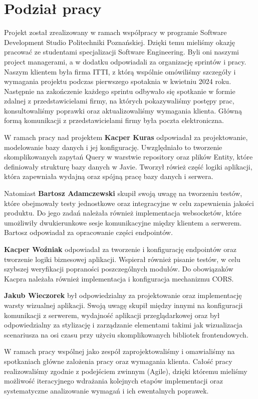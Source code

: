 \section{Podział pracy}
Projekt został zrealizowany w ramach współpracy w programie Software Development Studio Politechniki Poznańskiej. Dzięki temu mieliśmy okazję pracować ze studentami
specjalizacji Software Engineering. Byli oni naszymi project managerami, a w dodatku odpowiadali za organizację sprintów i pracy. Naszym klientem była firma ITTI, z którą
wspólnie omówiliśmy szczegóły i wymagania projektu podczas pierwszego spotaknia w kwietniu 2024 roku. Następnie na zakończenie każdego sprintu odbywało się spotkanie w formie zdalnej
z przedstawicielami firmy, na których pokazywaliśmy postępy prac, konsultowaliśmy poprawki oraz aktualizowaliśmy wymagania klienta. Główną formą komunikacji z przedstawicielami firmy
była poczta elektroniczna.

W ramach pracy nad projektem \textbf{Kacper Kuras} odpowiadał za projektowanie, modelowanie bazy danych i jej konfigurację. Uwzględniało
to tworzenie skomplikowanych zapytań Query w warstwie repository oraz plików Entity, które definiowały strukturę bazy danych w Javie. Tworzył rówież część logiki aplikacji, która zapewniała wydajną oraz spójną pracę bazy danych i serwera.

Natomiast \textbf{Bartosz Adamczewski} skupił swoją uwagę na tworzeniu testów, które obejmowały testy jednostkowe oraz integracyjne w celu zapewnienia jakości produktu.
Do jego zadań należała również implementacja websocketów, które umożliwiły dwukierunkowe sesje komunikacyjne między klientem a serwerem. Bartosz odpowiadał za opracowanie części endpointów.

\textbf{Kacper Woźniak} odpowiadał za tworzenie i konfigurację endpointów oraz tworzenie logiki biznesowej aplikacji. Wspierał również pisanie testów, w celu szybszej weryfikacji popraności poszczególnych modułów.
Do obowiązaków Kacpra należała również implementacja i konfiguracja mechanizmu CORS.

\textbf{Jakub Wieczorek} był odpowiedzialny za projektowanie oraz implementację warsty wizualnej aplikacji. Swoją uwagę skupił między innymi na konfiguracji komunikacji z serwerem, wydajność aplikacji przeglądarkowej oraz
był odpowiedzialny za stylizację i zarządzanie elementami takimi jak wizualizacja scenariusza na osi czasu przy użyciu skomplikowanych bibliotek frontendowych.

W ramach pracy wspólnej jako zespół zaprojektowaliśmy i omawialiśmy na spotkaniach główne zalożenia pracy oraz wymagania klienta. Całość pracy realizowaliśmy zgodnie z podejściem zwinnym (Agile), dzięki któremu mieliśmy możliwość iteracyjnego wdrażania
kolejnych etapów implementacji oraz systematyczne analizowanie wymagań i ich ewentalnych poprawek.

